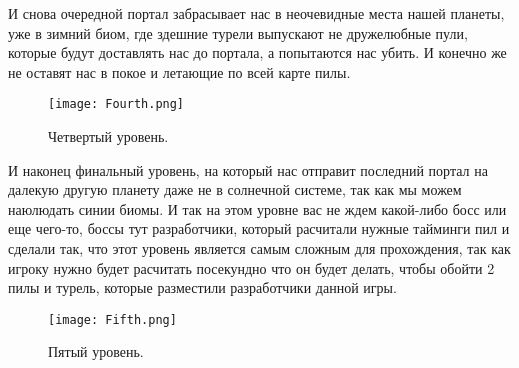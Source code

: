 \documentclass[a4paper,12pt]{article}
\begin{document}
И снова очередной портал забрасывает нас в неочевидные места нашей планеты, уже в зимний биом, где здешние турели выпускают не дружелюбные пули, которые будут доставлять нас до портала, а попытаются нас убить. И конечно же не оставят нас в покое и летающие по всей карте пилы. 

\begin{figure}[H] 
    \centering
    \texttt{[image: Fourth.png]} 
    \caption{Четвертый уровень.}
    \label{fig:player_character}
\end{figure}

И наконец финальный уровень, на который нас отправит последний портал на далекую другую планету даже не в солнечной системе, так как мы можем наюлюдать синии биомы. И так на этом уровне вас не ждем какой-либо босс или еще чего-то, боссы тут разработчики, который расчитали нужные тайминги пил и сделали так, что этот уровень является самым сложным для прохождения, так как игроку нужно будет расчитать посекундно что он будет делать, чтобы обойти 2 пилы и турель, которые разместили разработчики данной игры.

\begin{figure}[H] 
    \centering
    \texttt{[image: Fifth.png]} 
    \caption{Пятый уровень.}
    \label{fig:player_character}
\end{figure}
\end{document}
